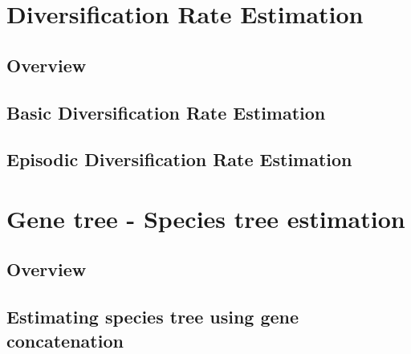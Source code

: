 \documentclass[11pt]{book}
\begin{document}
\part{Diversification Rate Estimation}

\chapter{Overview}
\def \ResourcePath {RB_DiversificationRateIntro_Tutorial/}


%

\chapter{Basic Diversification Rate Estimation}
\def \ResourcePath {RB_DiversificationRate_Tutorial/}


\chapter{Episodic Diversification Rate Estimation}
\def \ResourcePath {RB_DiversificationRateEpisodic_Tutorial/}






\part{Gene tree - Species tree estimation}

\chapter{Overview}
\def \ResourcePath {RB_GTST_Tutorial/}


\chapter{Estimating species tree using gene concatenation}
\def \ResourcePath {RB_GeneConcatenation_Tutorial/}

\end{document}
